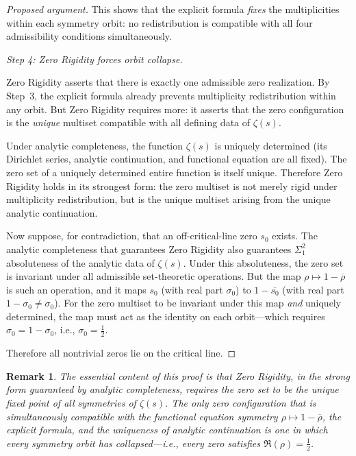 \documentclass{article}
\newtheorem{remark}[theorem]{Remark}
\theoremstyle{definition}
\begin{document}
\begin{proof}[Proposed argument]
This shows that the explicit formula \emph{fixes} the multiplicities 
within each symmetry orbit: no redistribution is compatible with all 
four admissibility conditions simultaneously.

\medskip
\noindent
\emph{Step 4: Zero Rigidity forces orbit collapse.}

Zero Rigidity asserts that there is exactly one admissible zero 
realization. By Step~3, the explicit formula already prevents 
multiplicity redistribution within any orbit. But Zero Rigidity 
requires more: it asserts that the zero configuration is the 
\emph{unique} multiset compatible with all defining data of $\zeta(s)$.

Under analytic completeness, the function $\zeta(s)$ is uniquely 
determined (its Dirichlet series, analytic continuation, and functional 
equation are all fixed). The zero set of a uniquely determined entire 
function is itself unique. Therefore Zero Rigidity holds in its 
strongest form: the zero multiset is not merely rigid under 
multiplicity redistribution, but is the unique multiset arising from 
the unique analytic continuation.

Now suppose, for contradiction, that an off-critical-line zero $s_0$ 
exists. The analytic completeness that guarantees Zero Rigidity also 
guarantees $\Sigma^2_1$ absoluteness of the analytic data of $\zeta(s)$. 
Under this absoluteness, the zero set is invariant under all admissible 
set-theoretic operations. But the map $\rho \mapsto 1-\overline{\rho}$ 
is such an operation, and it maps $s_0$ (with real part $\sigma_0$) to 
$1-\overline{s_0}$ (with real part $1-\sigma_0 \neq \sigma_0$). For the 
zero multiset to be invariant under this map \emph{and} uniquely 
determined, the map must act as the identity on each orbit---which 
requires $\sigma_0 = 1-\sigma_0$, i.e., $\sigma_0 = \tfrac{1}{2}$.

Therefore all nontrivial zeros lie on the critical line.
\end{proof}

\begin{remark}
The essential content of this proof is that Zero Rigidity, in the 
strong form guaranteed by analytic completeness, requires the zero set 
to be the unique fixed point of all symmetries of $\zeta(s)$. The only 
zero configuration that is simultaneously compatible with the functional 
equation symmetry $\rho \mapsto 1-\overline{\rho}$, the explicit 
formula, and the uniqueness of analytic continuation is one in which 
every symmetry orbit has collapsed---i.e., every zero satisfies 
$\Re(\rho) = \tfrac{1}{2}$.
\end{remark}
\end{document}
